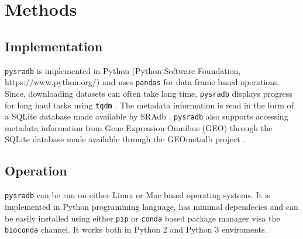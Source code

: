 \documentclass[9pt,a4paper]{extarticle}
\begin{document}
\section*{Methods}

\subsection*{Implementation}
\texttt{pysradb} is implemented in Python (Python Software Foundation, https://www.python.org/) \cite{vanRossum:2011:PLR:2011965}
and uses \texttt{pandas} \cite{mckinney-proc-scipy-2010} for
data frame based operations. Since, downloading datasets can often take long time,
\texttt{pysradb} displays progress for long haul tasks using \texttt{tqdm} \cite{casper_da_costa_luis_2018_1211527}.
The metadata information is read in the form of a SQLite \cite{about_sqlite} database made available by SRAdb \cite{zhu2013sradb}. \texttt{pysradb} also supports accessing metadata 
information from Gene Expression Omnibus (GEO)
 \cite{edgar2002gene,barrett2012ncbi} through the SQLite database made available 
through the GEOmetadb project \cite{zhu2008geometadb}.


\subsection*{Operation}

\texttt{pysradb} can be run on either Linux or Mac based operating systems. It is 
implemented in Python programming language, has minimal dependecies and can be easily installed using either \texttt{pip} or \texttt{conda} based package manager visa the \texttt{bioconda} \cite{gruning2018bioconda} channel. It works both in Python 2 and Python 3 enviroments.

\begin{comment}


\section*{Results} %
This section is only required if the paper includes novel data or analyses, and should be written as a traditional results section.
\end{comment}
\end{document}

